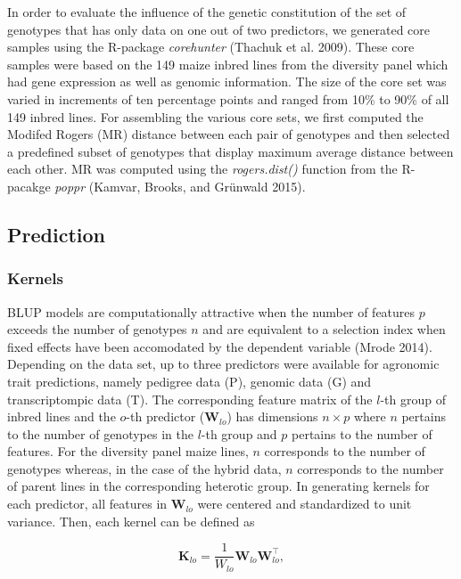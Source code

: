 \documentclass[]{elsarticle} %
\begin{document}
In order to evaluate the influence of the genetic constitution of the
set of genotypes that has only data on one out of two predictors, we
generated core samples using the R-package \emph{corehunter} (Thachuk et
al. 2009). These core samples were based on the 149 maize inbred lines
from the diversity panel which had gene expression as well as genomic
information. The size of the core set was varied in increments of ten
percentage points and ranged from 10\% to 90\% of all 149 inbred lines.
For assembling the various core sets, we first computed the Modifed
Rogers (MR) distance between each pair of genotypes and then selected a
predefined subset of genotypes that display maximum average distance
between each other. MR was computed using the \emph{rogers.dist()}
function from the R-pacakge \emph{poppr} (Kamvar, Brooks, and Grünwald
2015).

\subsection{Prediction}\label{prediction}

\subsubsection{Kernels}\label{kernels}

BLUP models are computationally attractive when the number of features
\(p\) exceeds the number of genotypes \(n\) and are equivalent to a
selection index when fixed effects have been accomodated by the
dependent variable (Mrode 2014). Depending on the data set, up to three
predictors were available for agronomic trait predictions, namely
pedigree data (P), genomic data (G) and transcriptompic data (T). The
corresponding feature matrix of the \(l\)-th group of inbred lines and
the \(o\)-th predictor (\(\mathbf{W}_{lo}\)) has dimensions
\(n \times p\) where \(n\) pertains to the number of genotypes in the
\(l\)-th group and \(p\) pertains to the number of features. For the
diversity panel maize lines, \(n\) corresponds to the number of
genotypes whereas, in the case of the hybrid data, \(n\) corresponds to
the number of parent lines in the corresponding heterotic group. In
generating kernels for each predictor, all features in
\(\mathbf{W}_{lo}\) were centered and standardized to unit variance.
Then, each kernel can be defined as

\begin{equation} \label{eq:GenomicRelationship}
  \mathbf{K}_{lo} = \frac{1}{W_{lo}} \mathbf{W}_{lo} \mathbf{W}_{lo}^{\top},
\end{equation}
\end{document}
